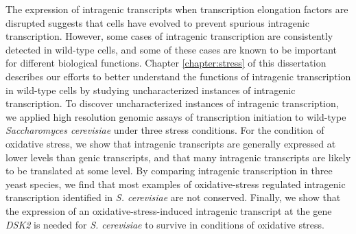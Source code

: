\begin{abstractpage}
The expression of intragenic transcripts when transcription elongation factors are disrupted suggests that cells have evolved to prevent spurious intragenic transcription.
However, some cases of intragenic transcription are consistently detected in wild-type cells, and some of these cases are known to be important for different biological functions.
Chapter \ref{chapter:stress} of this dissertation describes our efforts to better understand the functions of intragenic transcription in wild-type cells by studying uncharacterized instances of intragenic transcription.
To discover uncharacterized instances of intragenic transcription, we applied high resolution genomic assays of transcription initiation to wild-type \textit{Saccharomyces cerevisiae} under three stress conditions.
For the condition of oxidative stress, we show that intragenic transcripts are generally expressed at lower levels than genic transcripts, and that many intragenic transcripts are likely to be translated at some level.
By comparing intragenic transcription in three yeast species, we find that most examples of oxidative-stress regulated intragenic transcription identified in \textit{S. cerevisiae} are not conserved.
Finally, we show that the expression of an oxidative-stress-induced intragenic transcript at the gene \textit{DSK2} is needed for \textit{S. cerevisiae} to survive in conditions of oxidative stress.

\end{abstractpage}
\cleardoublepage

\tableofcontents
\cleardoublepage


\newpage
{}
{}
\listoffigures
\cleardoublepage

